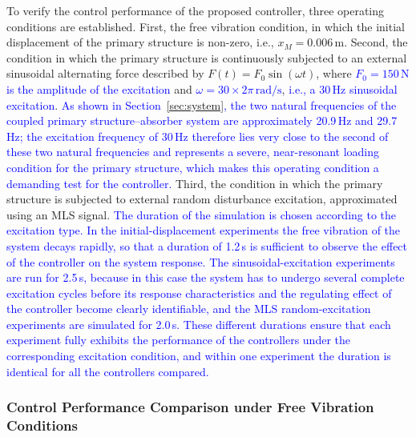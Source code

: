 \documentclass[review]{elsarticle}
\begin{document}
To verify the control performance of the proposed controller, three operating conditions are established.
First, the free vibration condition, in which the initial displacement of the primary structure is non-zero, i.e., $x_M = 0.006\,\text{m}$.
Second, the condition in which the primary structure is continuously subjected to an external sinusoidal alternating force described by $F(t)=F_0\sin(\omega t)$, where \textcolor{blue}{$F_0 = 150\,\mathrm{N}$ is the amplitude of the excitation} and \textcolor{blue}{$\omega = 30 \times 2\pi\,\text{rad/s}$}, \textcolor{blue}{i.e., a 30\,Hz sinusoidal excitation}. \textcolor{blue}{As shown in Section~\ref{sec:system}, the two natural frequencies of the coupled primary structure--absorber system are approximately 20.9\,Hz and 29.7\,Hz; the excitation frequency of 30\,Hz therefore lies very close to the second of these two natural frequencies and represents a severe, near-resonant loading condition for the primary structure, which makes this operating condition a demanding test for the controller.}
Third, the condition in which the primary structure is subjected to external random disturbance excitation, approximated using an MLS signal.
\textcolor{blue}{The duration of the simulation is chosen according to the excitation type. In the initial-displacement experiments the free vibration of the system decays rapidly, so that a duration of 1.2\,s is sufficient to observe the effect of the controller on the system response. The sinusoidal-excitation experiments are run for 2.5\,s, because in this case the system has to undergo several complete excitation cycles before its response characteristics and the regulating effect of the controller become clearly identifiable, and the MLS random-excitation experiments are simulated for 2.0\,s. These different durations ensure that each experiment fully exhibits the performance of the controllers under the corresponding excitation condition, and within one experiment the duration is identical for all the controllers compared.}

\subsubsection{Control Performance Comparison under Free Vibration Conditions}
\end{document}

